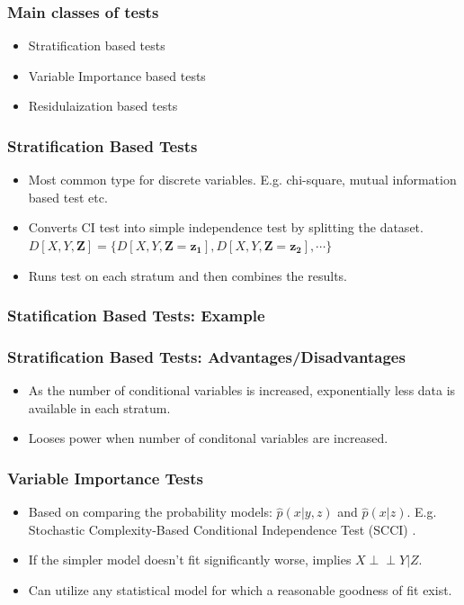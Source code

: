 \documentclass{beamer}
\def\ci{\perp\!\!\!\!\!\perp}
\begin{document}
\begin{frame}
	\frametitle{Main classes of tests}
	\begin{itemize}
		\setlength\itemsep{1em}
		\item Stratification based tests
		\item Variable Importance based tests
		\item Residulaization based tests
	\end{itemize}
\end{frame}

\begin{frame}
	\frametitle{Stratification Based Tests}
	\begin{itemize}
		\setlength\itemsep{1em}
		\item Most common type for discrete variables. E.g. chi-square,
			mutual information based test etc. 
		\item Converts CI test into simple independence test by splitting 
			the dataset.
		$ D[X, Y, \bm{Z}] = \{ D[X, Y, \bm{Z}=\bm{z_1}], D[X, Y, \bm{Z}=\bm{z_2}], \cdots \} $	
		\item Runs test on each stratum and then combines the results.
	\end{itemize}
\end{frame}
\begin{frame}
	\frametitle{Statification Based Tests: Example}

\end{frame}
\begin{frame}
	\frametitle{Stratification Based Tests: Advantages/Disadvantages}
	\begin{itemize}
		\item As the number of conditional variables is increased, exponentially
			less data is available in each stratum.
		\item Looses power when number of conditonal variables
			are increased.
	\end{itemize}
\end{frame}

\begin{frame}
	\frametitle{Variable Importance Tests}
	\begin{itemize}
		\setlength\itemsep{1em}
		\item Based on comparing the probability models: $\hat{p}(x |
			y, z) $ and $ \hat{p}(x | z) $. E.g. Stochastic
			Complexity-Based Conditional Independence Test (SCCI) \footnotemark.
		\item If the simpler model doesn't fit significantly worse, implies $ X \ci Y | Z $.
		\item Can utilize any statistical model for which a reasonable goodness
			of fit exist.
	\end{itemize}

\end{frame}
\end{document}
